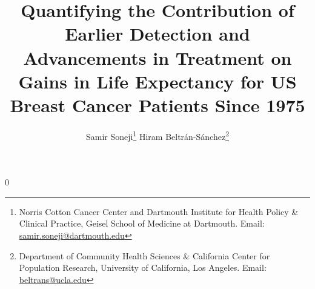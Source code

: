 \documentclass[11pt,letterpaper]{article}
\theoremstyle{plain}
\theoremstyle{remark}
\numberwithin{equation}{section}
\begin{document}
\newcommand\spacingset[1]{\renewcommand{\baselinestretch}%
{#1}\small\normalsize}
\spacingset{1}

\newcommand{\blind}{0} \newcommand{\tit}{Quantifying the Contribution of Earlier Detection and Advancements in Treatment on Gains in Life Expectancy for US Breast Cancer Patients Since 1975}

\blind

 {\title{\bf \tit}
 
  \author{Samir Soneji\thanks{Norris Cotton Cancer Center and
      Dartmouth Institute for Health Policy \& Clinical Practice,
      Geisel School of Medicine at Dartmouth. Email: \href{mailto:samir.soneji@dartmouth.edu}{samir.soneji@dartmouth.edu}}
  \quad \quad 
  Hiram Beltr\'{a}n-S\'{a}nchez\thanks{Department of Community Health
    Sciences \& California Center for Population Research, University of California, Los Angeles. Email:
    \href{mailto:beltrans@ucla.edu}{beltrans@ucla.edu}}}

\date{ }

\maketitle} \fi
\end{document}
